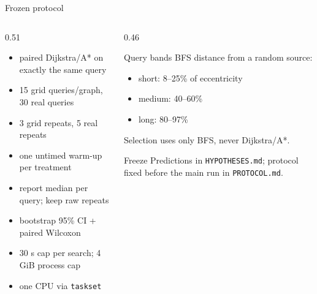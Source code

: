 \documentclass[aspectratio=169,10pt]{beamer}
\begin{document}
\begin{frame}{Frozen protocol}
  \begin{columns}[T,onlytextwidth]
    \begin{column}{0.51\textwidth}
      \begin{itemize}
        \item paired Dijkstra/A* on exactly the same query
        \item 15 grid queries/graph, 30 real queries
        \item 3 grid repeats, 5 real repeats
        \item one untimed warm-up per treatment
        \item report median per query; keep raw repeats
        \item bootstrap 95\% CI + paired Wilcoxon
        \item 30 s cap per search; 4 GiB process cap
        \item one CPU via \texttt{taskset}
      \end{itemize}
    \end{column}
    \begin{column}{0.46\textwidth}
      \begin{block}{Query bands}
        \small
        BFS distance from a random source:
        \begin{itemize}
          \item short: 8--25\% of eccentricity
          \item medium: 40--60\%
          \item long: 80--97\%
        \end{itemize}
        Selection uses only BFS, never Dijkstra/A*.
      \end{block}
      \begin{block}{Freeze}
        Predictions in \texttt{HYPOTHESES.md}; protocol fixed before the main
        run in \texttt{PROTOCOL.md}.
      \end{block}
    \end{column}
  \end{columns}
\end{frame}
\end{document}
